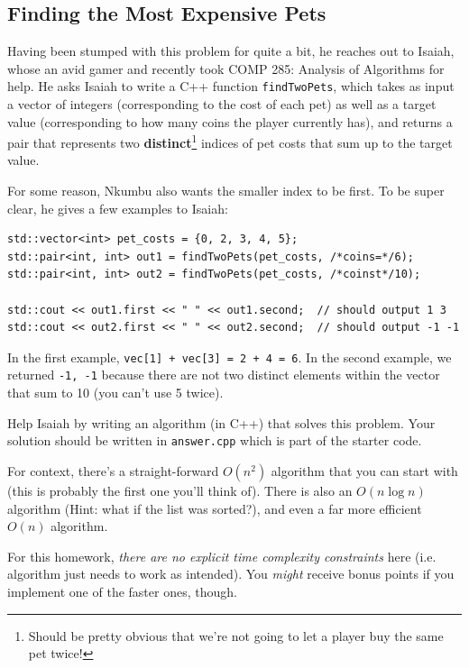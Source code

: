 \documentclass [12pt]{article}
\begin{document}
\subsection{Finding the Most Expensive Pets}
 Having been stumped with this problem for quite a bit, he reaches out to Isaiah, whose an avid gamer and recently took COMP 285: Analysis of Algorithms for help. He asks Isaiah to write a C++ function \texttt{findTwoPets}, which takes as input a vector of integers (corresponding to the cost of each pet) as well as a target value (corresponding to how many coins the player currently has), and returns a pair that represents two \textbf{distinct}\footnote{Should be pretty obvious that we're not going to let a player buy the same pet twice!} indices of pet costs that sum up to the target value.

For some reason, Nkumbu also wants the smaller index to be first. To be super clear, he gives a few examples to Isaiah:

\vspace{2em}
\begin{verbatim}
std::vector<int> pet_costs = {0, 2, 3, 4, 5};
std::pair<int, int> out1 = findTwoPets(pet_costs, /*coins=*/6);
std::pair<int, int> out2 = findTwoPets(pet_costs, /*coinst*/10);

std::cout << out1.first << " " << out1.second;  // should output 1 3
std::cout << out2.first << " " << out2.second;  // should output -1 -1
\end{verbatim}

In the first example, \texttt{vec[1] + vec[3] = 2 + 4 = 6}. In the second example, we returned \texttt{-1, -1} because there are not two distinct elements within the vector that sum to 10 (you can't use 5 twice).

Help Isaiah by writing an algorithm (in C++) that solves this problem. Your solution should be written in \texttt{answer.cpp} which is part of the starter code. 

For context, there's a straight-forward $O(n^2)$ algorithm that you can start with (this is probably the first one you'll think of). There is also an $O(n \log n)$ algorithm (Hint: what if the list was sorted?), and even a far more efficient $O(n)$ algorithm.

For this homework, \textit{there are no explicit time complexity constraints} here (i.e. algorithm just needs to work as intended). You \textit{might} receive bonus points if you implement one of the faster ones, though. 
\end{document}
